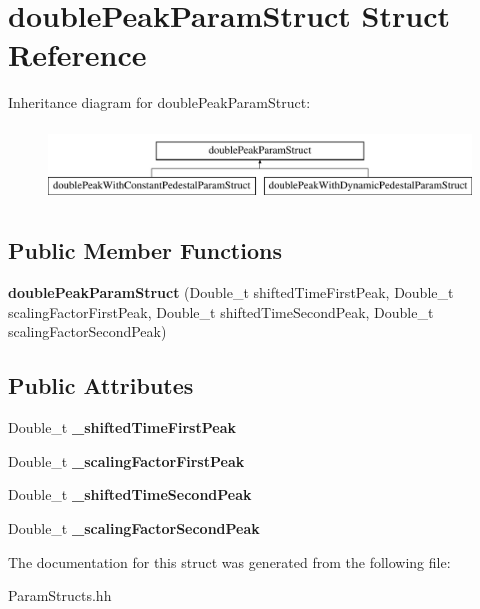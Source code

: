 \hypertarget{structdouble_peak_param_struct}{}\section{double\+Peak\+Param\+Struct Struct Reference}
\label{structdouble_peak_param_struct}
Inheritance diagram for double\+Peak\+Param\+Struct\+:\begin{figure}[H]
\begin{center}
\leavevmode
\includegraphics[height=2.000000cm]{structdouble_peak_param_struct}
\end{center}
\end{figure}
\subsection*{Public Member Functions}
\begin{DoxyCompactItemize}
\item 
\hypertarget{structdouble_peak_param_struct_aeb34f180e50540e55ee7e5a3ff27634d}{}{\bfseries double\+Peak\+Param\+Struct} (Double\+\_\+t shifted\+Time\+First\+Peak, Double\+\_\+t scaling\+Factor\+First\+Peak, Double\+\_\+t shifted\+Time\+Second\+Peak, Double\+\_\+t scaling\+Factor\+Second\+Peak)\label{structdouble_peak_param_struct_aeb34f180e50540e55ee7e5a3ff27634d}

\end{DoxyCompactItemize}
\subsection*{Public Attributes}
\begin{DoxyCompactItemize}
\item 
\hypertarget{structdouble_peak_param_struct_a9dd38f714912463e1dfc64b95db3988b}{}Double\+\_\+t {\bfseries \+\_\+shifted\+Time\+First\+Peak}\label{structdouble_peak_param_struct_a9dd38f714912463e1dfc64b95db3988b}

\item 
\hypertarget{structdouble_peak_param_struct_abc363790ee7e6eccac70d92306cb7d19}{}Double\+\_\+t {\bfseries \+\_\+scaling\+Factor\+First\+Peak}\label{structdouble_peak_param_struct_abc363790ee7e6eccac70d92306cb7d19}

\item 
\hypertarget{structdouble_peak_param_struct_a3cc0e97fd5dd9edc2a5b0caeb1ebcf97}{}Double\+\_\+t {\bfseries \+\_\+shifted\+Time\+Second\+Peak}\label{structdouble_peak_param_struct_a3cc0e97fd5dd9edc2a5b0caeb1ebcf97}

\item 
\hypertarget{structdouble_peak_param_struct_a3213e45bb4aa8f588fb605d70155e85c}{}Double\+\_\+t {\bfseries \+\_\+scaling\+Factor\+Second\+Peak}\label{structdouble_peak_param_struct_a3213e45bb4aa8f588fb605d70155e85c}

\end{DoxyCompactItemize}


The documentation for this struct was generated from the following file\+:\begin{DoxyCompactItemize}
\item 
Param\+Structs.\+hh\end{DoxyCompactItemize}
